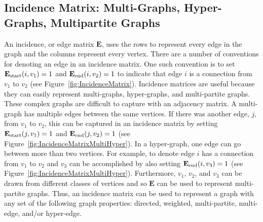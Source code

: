 \subsection{Incidence Matrix: Multi-Graphs, Hyper-Graphs, Multipartite Graphs}
An incidence, or edge matrix $\mathbf{E}$, uses the rows to represent every edge in the graph and the columns represent every vertex.  There are a number of conventions for denoting an edge in an incidence matrix.  One such convention is to set $\mathbf{E}_{\rm start}(i,v_1) = 1$ and $\mathbf{E}_{\rm end}(i,v_2) = 1$ to indicate that edge $i$ is a connection from $v_1$ to $v_2$ (see Figure~\ref{fig:IncidenceMatrix}).  Incidence matrices are useful because they can easily represent multi-graphs, hyper-graphs, and multi-partite graphs.  These complex graphs are difficult to capture with an adjacency matrix.  A multi-graph has multiple edges between the same vertices.  If there was another edge, $j$, from $v_1$ to $v_2$, this can be captured in an incidence matrix by setting $\mathbf{E}_{\rm start}(j,v_1) = 1$ and $\mathbf{E}_{\rm end}(j,v_2) = 1$ (see Figure~\ref{fig:IncidenceMatrixMultiHyper}).  In a hyper-graph, one edge can go between more than two vertices.  For example, to denote edge $i$ has a connection from $v_1$ to $v_2$ and $v_3$ can be accomplished by also setting $\mathbf{E}_{\rm end}(i,v_3) = 1$ (see Figure~\ref{fig:IncidenceMatrixMultiHyper}).  Furthermore, $v_1$, $v_2$, and $v_3$ can be drawn from  different classes of vertices and so $\mathbf{E}$ can be used to represent multi-partite graphs.  Thus, an incidence matrix can be used to represent a graph with any set of the following graph properties: directed, weighted, multi-partite, multi-edge, and/or hyper-edge.

